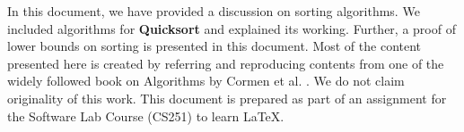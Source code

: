 In this document, we have provided a discussion on sorting algorithms. We included algorithms for \textbf{Quicksort} and explained its working. Further, a proof of lower bounds on sorting is presented in this document. Most of the content presented here is created by referring and reproducing contents from one of the widely followed book on Algorithms by Cormen et al. \cite{cormen}. We do not claim originality of this work. This document is prepared as part of an assignment for the Software Lab Course (CS251) to learn \LaTeX.
